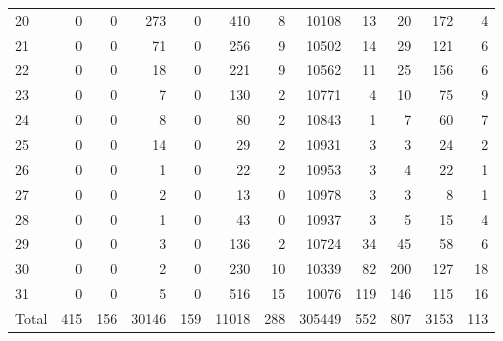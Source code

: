 \begin{table}
\begin{tabular}{lrrrrrrrrrrr}
20 & 0 & 0 & 273 & 0 & 410 & 8 & 10108 & 13 & 20 & 172 & 4 \\
21 & 0 & 0 & 71 & 0 & 256 & 9 & 10502 & 14 & 29 & 121 & 6 \\
22 & 0 & 0 & 18 & 0 & 221 & 9 & 10562 & 11 & 25 & 156 & 6 \\
23 & 0 & 0 & 7 & 0 & 130 & 2 & 10771 & 4 & 10 & 75 & 9 \\
24 & 0 & 0 & 8 & 0 & 80 & 2 & 10843 & 1 & 7 & 60 & 7 \\
25 & 0 & 0 & 14 & 0 & 29 & 2 & 10931 & 3 & 3 & 24 & 2 \\
26 & 0 & 0 & 1 & 0 & 22 & 2 & 10953 & 3 & 4 & 22 & 1 \\
27 & 0 & 0 & 2 & 0 & 13 & 0 & 10978 & 3 & 3 & 8 & 1 \\
28 & 0 & 0 & 1 & 0 & 43 & 0 & 10937 & 3 & 5 & 15 & 4 \\
29 & 0 & 0 & 3 & 0 & 136 & 2 & 10724 & 34 & 45 & 58 & 6 \\
30 & 0 & 0 & 2 & 0 & 230 & 10 & 10339 & 82 & 200 & 127 & 18 \\
31 & 0 & 0 & 5 & 0 & 516 & 15 & 10076 & 119 & 146 & 115 & 16 \\
Total & 415 & 156 & 30146 & 159 & 11018 & 288 & 305449 & 552 & 807 & 3153 & 113 \\
\end{tabular}
\end{table}
